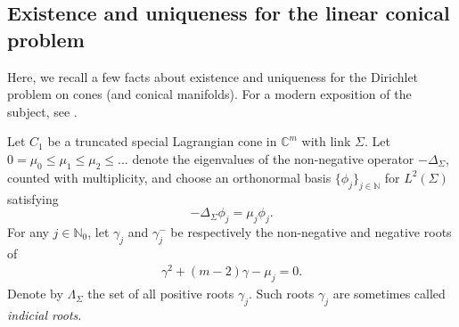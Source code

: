 \documentclass[11pt]{amsart}
\theoremstyle{definition}
\theoremstyle{remark}
\newcommand{\C}{\mathbb{C}}
\begin{document}
\subsection{Existence and uniqueness for the linear conical problem}\label{ssec: existence-uniqueness}
Here, we recall a few facts about existence and uniqueness for the Dirichlet problem on cones (and conical manifolds). For a modern exposition of the subject, see \cite[Section 2]{FMM}.

Let $C_1$ be a truncated special Lagrangian cone in $\C^m$ with link $\Sigma$. Let $0=\mu_0\leq\mu_1\leq \mu_2\leq...$ denote the eigenvalues of the non-negative operator
\(-\Delta_\Sigma\), counted with multiplicity, and choose an orthonormal basis
\(\{\phi_j\}_{j \in \mathbb{N}}\) for \(L^2(\Sigma)\) satisfying
\[
-\Delta_\Sigma\phi_j=\mu_j\phi_j.
\]
For any $j\in \mathbb{N}_0$, let $\gamma_j$ and $\gamma_j^-$ be respectively the non-negative and negative roots of
    \begin{align}\label{eq: pol-for-gamma}
        \gamma^2+(m-2)\gamma-\mu_j=0.
    \end{align}
Denote by $\Lambda_\Sigma$ the set of all positive roots $\gamma_j$. Such roots $\gamma_j$ are sometimes called \emph{indicial roots}.
\end{document}
